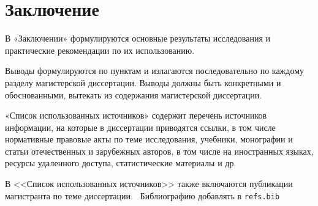 \chapter*{Заключение}
В «Заключении» формулируются основные результаты исследования и практические рекомендации по их использованию.

Выводы формулируются по пунктам и излагаются последовательно по каждому разделу магистерской диссертации. Выводы должны быть конкретными и обоснованными, вытекать из содержания магистерской диссертации.

«Список использованных источников» содержит перечень источников информации, на которые в диссертации приводятся ссылки, в том числе нормативные правовые акты по теме исследования, учебники, монографии и статьи отечественных и зарубежных авторов, в том числе на иностранных языках, ресурсы удаленного доступа, статистические материалы и др.

В <<Список использованных источников>> также включаются публикации магистранта по теме диссертации.~\cite{bib-prikaz} \cite{bibtex} Библиографию добавлять в \texttt{refs.bib}